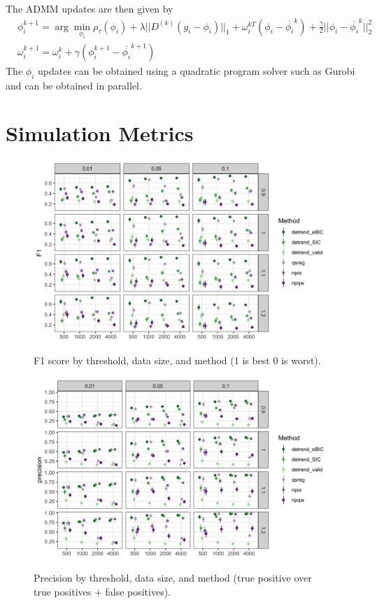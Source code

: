 \documentclass[12pt]{article}
\begin{document}
	The ADMM updates are then given by
	\begin{align}
	&\phi_i^{k+1} = \arg\min_{\phi_i}\rho_\tau(\phi_i) + \lambda||D^{(k)}(y_i-\phi_i)||_1 + \omega_i^{kT}(\phi_i - \overline{\phi_i}^k) + \frac{\gamma}{2}||\phi_i - \overline{\phi_i}^k||_2^2\\
	&\omega_i^{k+1} = \omega_i^{k} + \gamma(\phi_i^{k+1} - \overline{\phi_i}^{k+1})
	\end{align}
	The $\phi_i$ updates can be obtained using a quadratic program solver such as Gurobi and can be obtained in parallel. 
	
	\section{Simulation Metrics}
	
	\begin{figure}[h!]
		\caption{F1 score by threshold, data size, and method (1 is best 0 is worst).}
		\includegraphics[width = \linewidth]{Figures/peaks_F1.png}
	\end{figure}
	
	\begin{figure}[h!]
		\caption{Precision by threshold, data size, and method (true positive over true positives + false positives).}
		\includegraphics[width = \linewidth]{Figures/peaks_precision.png}
	\end{figure}
	
\end{document}
